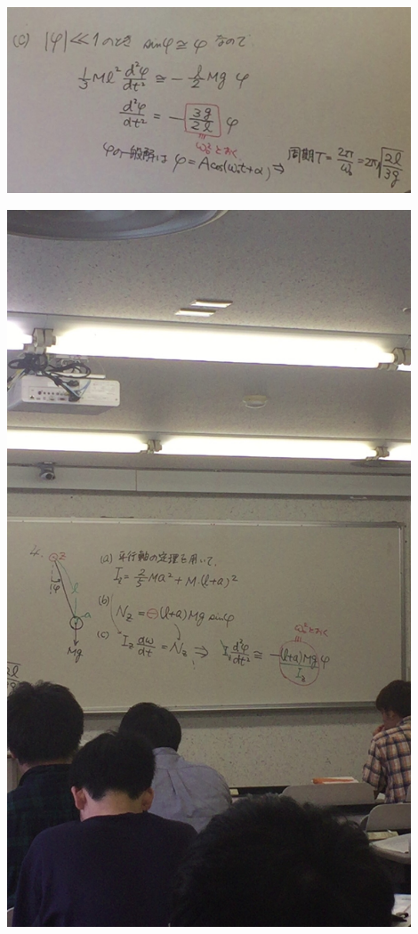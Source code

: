 \documentclass{jsarticle}
\begin{document}
	\begin{center}
		\includegraphics[width=12cm]{5_20_5.JPG}
	\end{center}
	\begin{center}
		\includegraphics[width=12cm]{5_20_6.JPG}
	\end{center}

	
\end{document}
